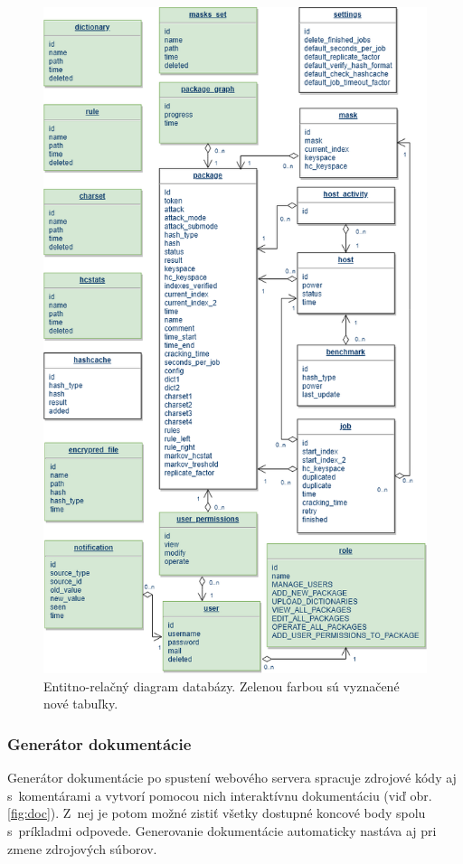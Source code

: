 \documentclass[zadani,slovak]{fitthesis}
\begin{document}
\begin{figure}[H]
    \centering
    \includegraphics[scale=0.58]{obrazky/ER.PNG}
    \caption{Entitno-relačný diagram databázy. Zelenou farbou sú vyznačené nové tabuľky.}
    \label{fig:ER}
\end{figure}


\subsubsection{Generátor dokumentácie}
Generátor dokumentácie po spustení webového servera spracuje zdrojové kódy aj s~komentárami a vytvorí pomocou nich interaktívnu dokumentáciu (viď obr. \ref{fig:doc}). Z~nej je potom možné zistiť všetky dostupné koncové body spolu s~príkladmi odpovede. Generovanie dokumentácie automaticky nastáva aj pri zmene zdrojových súborov.
\end{document}
